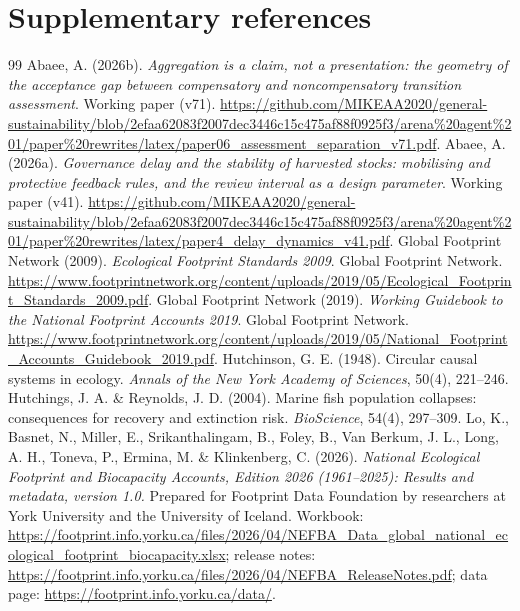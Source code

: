 \documentclass[11pt,a4paper]{article}
\begin{document}
\section*{Supplementary references}
\begin{thebibliography}{99}
\small
{} Abaee, A. (2026b). \emph{Aggregation is a claim, not a presentation: the geometry of the acceptance gap between compensatory and noncompensatory transition assessment}. Working paper (v71). \url{https://github.com/MIKEAA2020/general-sustainability/blob/2efaa62083f2007dec3446c15c475af88f0925f3/arena%20agent%201/paper%20rewrites/latex/paper06_assessment_separation_v71.pdf}.
 Abaee, A. (2026a). \emph{Governance delay and the stability of harvested stocks: mobilising and protective feedback rules, and the review interval as a design parameter}. Working paper (v41). \url{https://github.com/MIKEAA2020/general-sustainability/blob/2efaa62083f2007dec3446c15c475af88f0925f3/arena%20agent%201/paper%20rewrites/latex/paper4_delay_dynamics_v41.pdf}.
 Global Footprint Network (2009). \emph{Ecological Footprint Standards 2009}. Global Footprint Network. \url{https://www.footprintnetwork.org/content/uploads/2019/05/Ecological_Footprint_Standards_2009.pdf}.
 Global Footprint Network (2019). \emph{Working Guidebook to the National Footprint Accounts 2019}. Global Footprint Network. \url{https://www.footprintnetwork.org/content/uploads/2019/05/National_Footprint_Accounts_Guidebook_2019.pdf}.
 Hutchinson, G. E. (1948). Circular causal systems in ecology. \emph{Annals of the New York Academy of Sciences}, 50(4), 221--246.
 Hutchings, J. A. \& Reynolds, J. D. (2004). Marine fish population collapses: consequences for recovery and extinction risk. \emph{BioScience}, 54(4), 297--309.
 Lo, K., Basnet, N., Miller, E., Srikanthalingam, B., Foley, B., Van Berkum, J. L., Long, A. H., Toneva, P., Ermina, M. \& Klinkenberg, C. (2026). \emph{National Ecological Footprint and Biocapacity Accounts, Edition 2026 (1961--2025): Results and metadata, version 1.0.} Prepared for Footprint Data Foundation by researchers at York University and the University of Iceland. Workbook: \url{https://footprint.info.yorku.ca/files/2026/04/NEFBA_Data_global_national_ecological_footprint_biocapacity.xlsx}; release notes: \url{https://footprint.info.yorku.ca/files/2026/04/NEFBA_ReleaseNotes.pdf}; data page: \url{https://footprint.info.yorku.ca/data/}.

\end{thebibliography}
\end{document}
